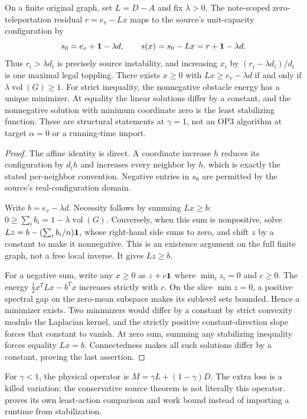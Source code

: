 \begin{proposition}
\label{prop:op3-conservative-sandpile-mapping}
On a finite original graph, set $L=D-A$ and fix $\lambda>0$.
The note-scoped zero-teleportation residual $r=e_v-Lx$ maps to the
source's unit-capacity configuration by
\[
 s_0=e_v+\mathbf{1}-\lambda d,\qquad
 s(x)=s_0-Lx=r+\mathbf{1}-\lambda d.
\]
Thus $r_i>\lambda d_i$ is precisely source instability, and increasing
$x_i$ by $(r_i-\lambda d_i)/d_i$ is one maximal legal toppling.
There exists $x\geq0$ with $Lx\geq e_v-\lambda d$ if and only if
$\lambda\operatorname{vol}(G)\geq1$. For strict inequality, the
nonnegative obstacle energy has a unique minimizer. At equality the
linear solutions differ by a constant, and the nonnegative solution
with minimum coordinate zero is the least stabilizing function.
These are structural statements at $\gamma=1$, not an OP3 algorithm
at target $\alpha=0$ or a running-time import.
\end{proposition}
\begin{proof}
The affine identity is direct. A coordinate increase $h$ reduces its
configuration by $d_i h$ and increases every neighbor by $h$, which is
exactly the stated per-neighbor convention. Negative entries in $s_0$
are permitted by the source's real-configuration domain.

Write $b=e_v-\lambda d$. Necessity follows by summing $Lx\geq b$:
$0\geq\sum_i b_i=1-\lambda\operatorname{vol}(G)$. Conversely, when
this sum is nonpositive, solve
$Lz=b-(\sum_i b_i/n)\mathbf{1}$, whose right-hand side sums to zero,
and shift $z$ by a constant to make it nonnegative. This is an
existence argument on the full finite graph, not a free local inverse.
It gives $Lz\geq b$.

For a negative sum, write any $x\geq0$ as $z+c\mathbf{1}$ where
$\min_i z_i=0$ and $c\geq0$. The energy
$\tfrac12x^TLx-b^Tx$ increases strictly with $c$. On the slice
$\min z=0$, a positive spectral gap on the zero-mean subspace makes
its sublevel sets bounded. Hence a minimizer exists. Two minimizers
would differ by a constant by strict convexity modulo the Laplacian
kernel, and the strictly positive constant-direction slope forces that
constant to vanish. At zero sum, summing any stabilizing inequality
forces equality $Lx=b$. Connectedness makes all such solutions differ
by a constant, proving the last assertion.
\end{proof}

For $\gamma<1$, the physical operator is
$M=\gamma L+(1-\gamma)D$. The extra loss is a killed variation;
the conservative source theorem is not literally this operator.
 proves its own least-action comparison
and work bound instead of importing a runtime from stabilization.

